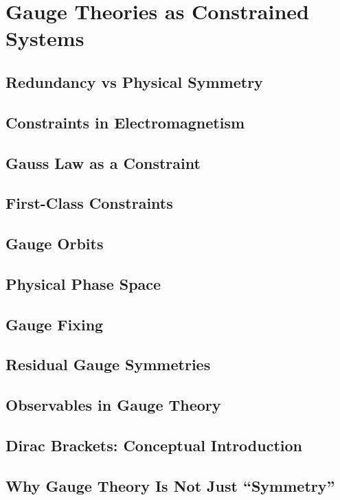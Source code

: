 \chapter{Gauge Theories as Constrained Systems}

\section{Redundancy vs Physical Symmetry}
\section{Constraints in Electromagnetism}
\section{Gauss Law as a Constraint}
\section{First-Class Constraints}
\section{Gauge Orbits}
\section{Physical Phase Space}
\section{Gauge Fixing}
\section{Residual Gauge Symmetries}
\section{Observables in Gauge Theory}
\section{Dirac Brackets: Conceptual Introduction}
\section{Why Gauge Theory Is Not Just ``Symmetry''}
